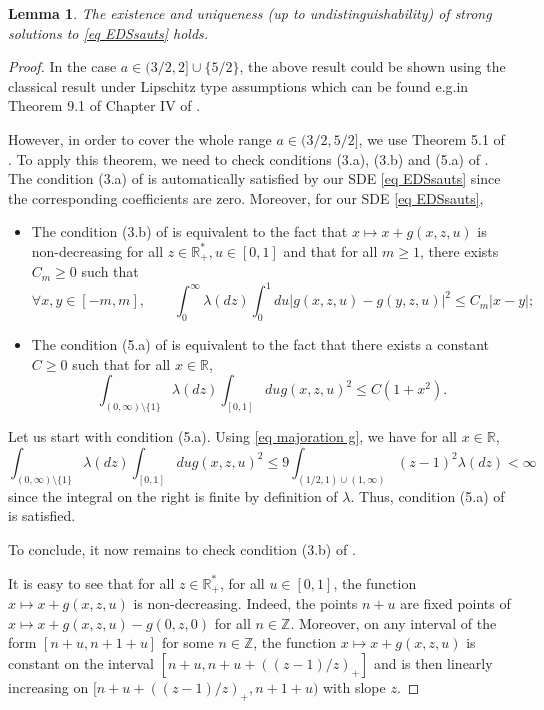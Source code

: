 \documentclass[11pt]{article}
\newtheorem{lemma}[theorem]{Lemma}
\numberwithin{equation}{section}
\def \R{\mathbb {R}}
\def \Z{\mathbb{Z}}
\begin{document}
\begin{lemma}\label{lemme solution forte}
	The existence and uniqueness (up to undistinguishability) of strong solutions to \eqref{eq EDSsauts} holds.
\end{lemma}
\begin{proof}
	In the case $a \in (3/2,2]\cup \{5/2\}$, the above result could be shown using the classical result under Lipschitz type assumptions which can be found e.g.\@ in Theorem 9.1 of Chapter IV of \cite{IW89}. 
	
	However, in order to cover the whole range $a \in (3/2, 5/2]$, we use Theorem 5.1 of \cite{LP12}. To apply this theorem, we need to check conditions (3.a), (3.b) and (5.a) of \cite{LP12}. The condition (3.a) of \cite{LP12} is automatically satisfied by our SDE \eqref{eq EDSsauts} since the corresponding coefficients are zero. 
	Moreover, for our SDE \eqref{eq EDSsauts},
	\begin{itemize}
		\item The condition (3.b) of \cite{LP12} is equivalent to the fact that $x\mapsto x + g(x,z,u)$ is non-decreasing for all $z\in \R_+^*,u \in [0,1]$ and that for all $m\ge 1$, there exists $C_m\ge0$ such that
		\begin{equation}\label{eq coeff lipschitz2}
		\forall x, y \in [-m,m], \qquad	\int_{0}^\infty \lambda(dz) \int_0^1du \left\vert g(x,z,u)-g(y,z,u)\right\vert^2 \le C_m \vert x-y \vert;
		\end{equation}
		\item The condition (5.a) of \cite{LP12} is equivalent to the fact that there exists a constant $C \ge 0$ such that for all $x \in \R$,
		$$
		\int_{(0,\infty) \setminus\{1\}}\lambda(dz) \int_{[0,1]} du g(x,z,u)^2 \le C(1+x^2).
		$$
	\end{itemize} 
	Let us start with condition (5.a). Using \eqref{eq majoration g}, we have for all $x \in \R$,
	\begin{equation}\label{eq integrale coeff au carre finie}
		\int_{(0,\infty) \setminus\{1\}}\lambda(dz) \int_{[0,1]} du g(x,z,u)^2 \le 9 \int_{(1/2,1)\cup (1,\infty)} (z-1)^2 \lambda (dz)<\infty 
	\end{equation}
	since the integral on the right is finite by definition of $\lambda$. Thus, condition (5.a) of \cite{LP12} is satisfied.
	
	To conclude, it now remains to check condition (3.b) of \cite{LP12}.
	
	It is easy to see that for all $z\in \R_+^*$, for all $u \in [0,1]$, the function $x\mapsto x+ g(x,z,u)$ is non-decreasing. Indeed, the points $n+u$ are fixed points of $x \mapsto x+g(x,z,u)-g(0,z,0)$ for all $n \in \Z$. Moreover, on any interval of the form $[n+u, n+1+u]$ for some $n \in \Z$, the function $x\mapsto x+ g(x,z,u)$ is constant on the interval $[n+u, n+u+ ((z-1)/z)_+]$ and is then linearly increasing on $[n+u+ ((z-1)/z)_+ , n+1+u)$ with slope $z$. 
	

\end{proof}
\end{document}
